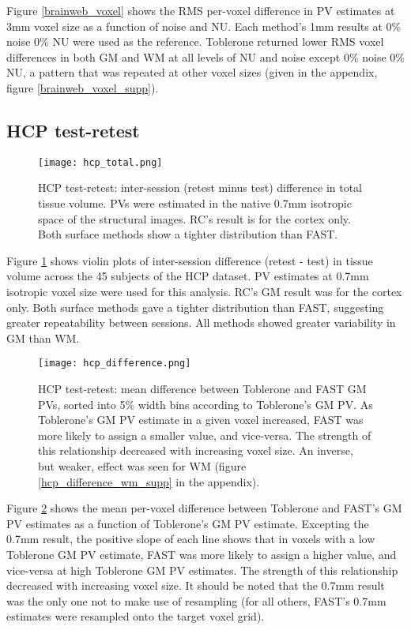 Figure \ref{brainweb_voxel} shows the RMS per-voxel difference in PV estimates at 3mm voxel size as a function of noise and NU. Each method’s 1mm results at 0\% noise 0\% NU were used as the reference. Toblerone returned lower RMS voxel differences in both GM and WM at all levels of NU and noise except 0\% noise 0\% NU, a pattern that was repeated at other voxel sizes (given in the appendix, figure \ref{brainweb_voxel_supp}).

\subsection{HCP test-retest}

\begin{figure}[H]
\centering
\texttt{[image: hcp\_total.png]}
\caption{HCP test-retest: inter-session (retest minus test) difference in total tissue volume. PVs were estimated in the native 0.7mm isotropic space of the structural images. RC’s result is for the cortex only. Both surface methods show a tighter distribution than FAST.}
\label{hcp_total}
\end{figure}

Figure \ref{hcp_total} shows violin plots of inter-session difference (retest - test) in tissue volume across the 45 subjects of the HCP dataset. PV estimates at 0.7mm isotropic voxel size were used for this analysis. RC’s GM result was for the cortex only. Both surface methods gave a tighter distribution than FAST, suggesting greater repeatability between sessions. All methods showed greater variability in GM than WM.

\begin{figure}[H]
\centering
\texttt{[image: hcp\_difference.png]}
\caption{HCP test-retest: mean difference between Toblerone and FAST GM PVs, sorted into 5\% width bins according to Toblerone’s GM PV. As Toblerone’s GM PV estimate in a given voxel increased, FAST was more likely to assign a smaller value, and vice-versa. The strength of this relationship decreased with increasing voxel size. An inverse, but weaker, effect was seen for WM (figure \ref{hcp_difference_wm_supp} in the appendix).}
\label{hcp_difference}
\end{figure}

Figure \ref{hcp_difference} shows the mean per-voxel difference between Toblerone and FAST’s GM PV estimates as a function of Toblerone’s GM PV estimate. Excepting the 0.7mm result, the positive slope of each line shows that in voxels with a low Toblerone GM PV estimate, FAST was more likely to assign a higher value, and vice-versa at high Toblerone GM PV estimates. The strength of this relationship decreased with increasing voxel size. It should be noted that the 0.7mm result was the only one not to make use of resampling (for all others, FAST’s 0.7mm estimates were resampled onto the target voxel grid).


